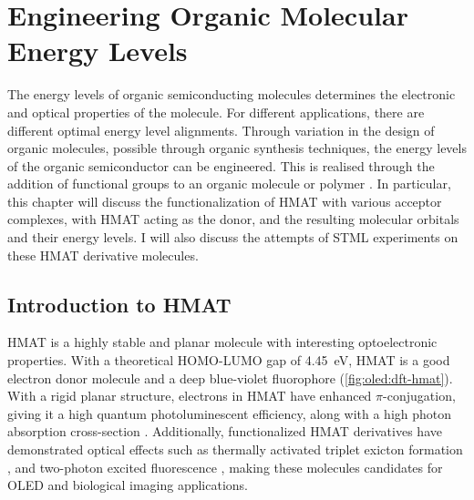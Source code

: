 
\chapter{Engineering Organic Molecular Energy Levels}
\label{ch:oled}


The energy levels of organic semiconducting molecules determines the electronic and optical properties of the molecule. For different applications, there are different optimal energy level alignments. Through variation in the design of organic molecules, possible through organic synthesis techniques, the energy levels of the organic semiconductor can be engineered. This is realised through the addition of functional groups to an organic molecule or polymer \citep{schwarze2016band, VanMullekom2001}. In particular, this chapter will discuss the functionalization of \ac{HMAT} with various acceptor complexes, with \ac{HMAT} acting as the donor, and the resulting molecular orbitals and their energy levels. I will also discuss the attempts of \ac{STML} experiments on these \ac{HMAT} derivative molecules.




\section{Introduction to HMAT}


\Acf{HMAT} is a highly stable and planar molecule with interesting optoelectronic properties. With a theoretical HOMO-LUMO gap of \SI{4.45}{eV}, \ac{HMAT} is a good electron donor molecule and a deep blue-violet fluorophore \cite{Tonge2020} (\autoref{fig:oled:dft-hmat}). With a rigid planar structure, electrons in \ac{HMAT} have enhanced $\pi$-conjugation, giving it a high quantum photoluminescent efficiency, along with a high photon absorption cross-section \citep{Makarov2012}. Additionally, functionalized \ac{HMAT} derivatives have demonstrated optical effects such as thermally activated triplet exicton formation \citep{Chen2017}, and two-photon excited fluorescence \citep{Fang2012,Paisley2020}, making these molecules candidates for \ac{OLED} and biological imaging applications. 

